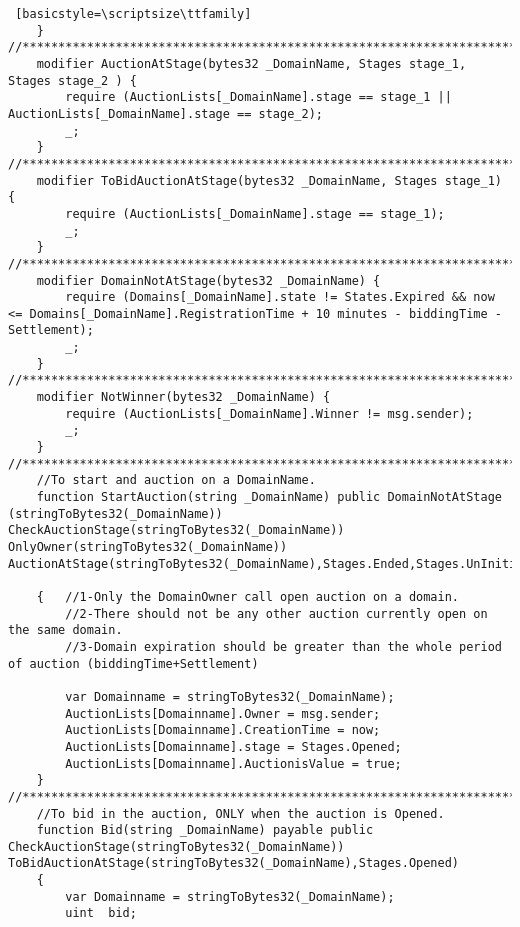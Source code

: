 \begin{lstlisting} [basicstyle=\scriptsize\ttfamily]
    }
//********************************************************************************************************************
    modifier AuctionAtStage(bytes32 _DomainName, Stages stage_1, Stages stage_2 ) {
        require (AuctionLists[_DomainName].stage == stage_1 || AuctionLists[_DomainName].stage == stage_2);
        _;
    }
//********************************************************************************************************************
    modifier ToBidAuctionAtStage(bytes32 _DomainName, Stages stage_1) {
        require (AuctionLists[_DomainName].stage == stage_1);
        _;
    }
//********************************************************************************************************************
    modifier DomainNotAtStage(bytes32 _DomainName) {
        require (Domains[_DomainName].state != States.Expired && now <= Domains[_DomainName].RegistrationTime + 10 minutes - biddingTime - Settlement);
        _;
    }
//********************************************************************************************************************
    modifier NotWinner(bytes32 _DomainName) {
        require (AuctionLists[_DomainName].Winner != msg.sender);
        _;
    }
//********************************************************************************************************************
    //To start and auction on a DomainName.
    function StartAuction(string _DomainName) public DomainNotAtStage (stringToBytes32(_DomainName)) CheckAuctionStage(stringToBytes32(_DomainName)) OnlyOwner(stringToBytes32(_DomainName)) AuctionAtStage(stringToBytes32(_DomainName),Stages.Ended,Stages.UnInitiallized)

    {   //1-Only the DomainOwner call open auction on a domain.
        //2-There should not be any other auction currently open on the same domain.
        //3-Domain expiration should be greater than the whole period of auction (biddingTime+Settlement)

        var Domainname = stringToBytes32(_DomainName);
        AuctionLists[Domainname].Owner = msg.sender;
        AuctionLists[Domainname].CreationTime = now;
        AuctionLists[Domainname].stage = Stages.Opened;
        AuctionLists[Domainname].AuctionisValue = true;
    }
//********************************************************************************************************************
    //To bid in the auction, ONLY when the auction is Opened.
    function Bid(string _DomainName) payable public CheckAuctionStage(stringToBytes32(_DomainName))  ToBidAuctionAtStage(stringToBytes32(_DomainName),Stages.Opened)
    {
        var Domainname = stringToBytes32(_DomainName);
        uint  bid;


\end{lstlisting}

